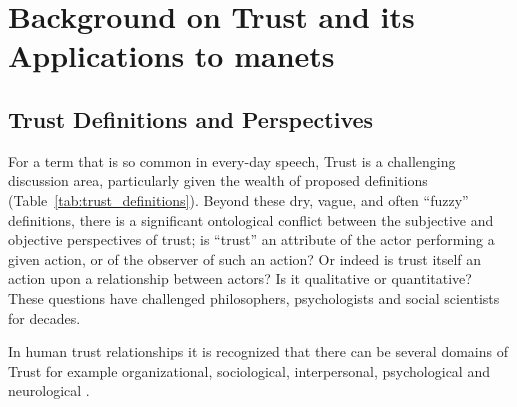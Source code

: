 \def\ChapterTitle{Background on Trust and its Applications to \gls{manet}s} %
\ifx\ifthesis\undefined

\else
\chapter{\ChapterTitle}
\label{Chapter\thechapter}
\fi
\section{Trust Definitions and Perspectives}
For a term that is so common in every-day speech, Trust is a challenging discussion area, particularly given the wealth of proposed definitions (Table~\ref{tab:trust_definitions}).
Beyond these dry, vague, and often ``fuzzy'' definitions, there is a significant ontological conflict between the subjective and objective perspectives of trust; is ``trust'' an attribute of the actor performing a given action, or of the observer of such an action? Or indeed is trust itself an action upon a relationship between actors? Is it qualitative or quantitative? These questions have challenged philosophers, psychologists and social scientists for decades.

In human trust relationships it is recognized that there can be several domains of Trust for example organizational, sociological, interpersonal, psychological and neurological \cite{Lee2004}.


